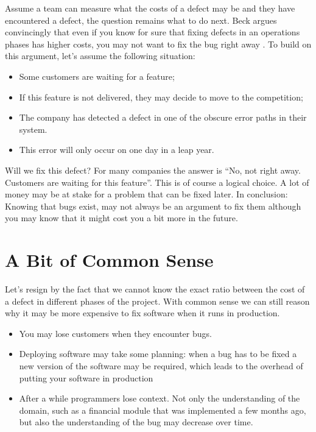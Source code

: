 Assume a team can measure what the costs of a defect may be and they have encountered a defect, the question remains what to do next.
Beck argues convincingly that even if you know for sure that fixing defects in an operations phases has higher costs, you may not want to fix the bug right away \autocite[22]{beck2000extreme}.
To build on this argument, let's assume the following situation:
\begin{itemize}[noitemsep]
\item Some customers are waiting for a feature;
\item If this feature is not delivered, they may decide to move to the competition;
\item The company has detected a defect in one of the obscure error paths in their system.
\item This error will only occur on one day in a leap year.
\end{itemize}
Will we fix this defect? For many companies the answer is ``No, not right away. Customers are waiting for this feature''.
This is of course a logical choice. A lot of money may be at stake for a problem that can be fixed later.
In conclusion: Knowing that bugs exist, may not always be an argument to fix them although you may know that it might cost you a bit more in the future.

\section*{A Bit of Common Sense}

Let's resign by the fact that we cannot know the exact ratio between the cost of a defect in different phases of the project.
With common sense we can still reason why it may be more expensive to fix software when it runs in production.

\begin{itemize}[noitemsep]
\item You may lose customers when they encounter bugs.
\item Deploying software may take some planning: when a bug has to be fixed a new version of the software may be required, which leads to the overhead of putting your software in production
\item After a while programmers lose context. Not only the understanding of the domain, such as a financial module that was implemented a few months ago, but also the understanding of the bug may decrease over time.
\end{itemize}

